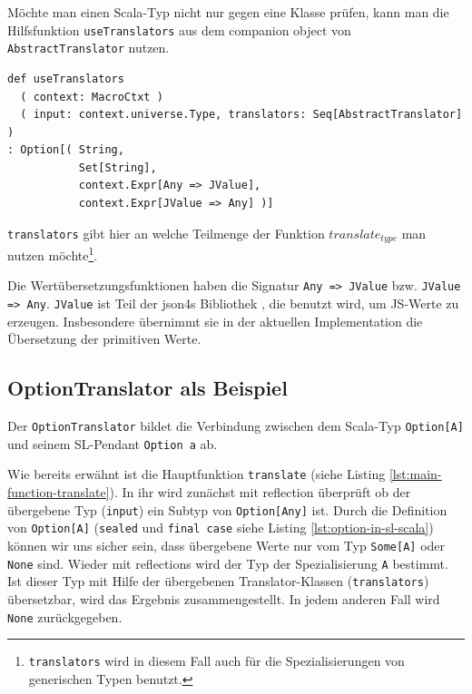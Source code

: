 \documentclass[12pt,bibtotoc]{scrreprt}
\begin{document}
Möchte man einen Scala-Typ nicht nur gegen eine Klasse prüfen, kann man die Hilfsfunktion \lstinline!useTranslators! aus dem companion object von \lstinline!AbstractTranslator! nutzen.

\begin{lstlisting}[caption=Statische Hilfsfunktion in AbstractTranslator, label=lst:hilfsfunktionen]
def useTranslators
  ( context: MacroCtxt )
  ( input: context.universe.Type, translators: Seq[AbstractTranslator] )
: Option[( String,
           Set[String], 
           context.Expr[Any => JValue], 
           context.Expr[JValue => Any] )]
\end{lstlisting}

\lstinline!translators! gibt hier an welche Teilmenge der Funktion $translate_{type}$ man nutzen möchte\footnote{\lstinline!translators! wird in diesem Fall auch für die Spezialisierungen von generischen Typen benutzt.}. 

Die Wertübersetzungsfunktionen haben die Signatur \lstinline!Any => JValue! bzw. \lstinline!JValue => Any!. \lstinline!JValue! ist Teil der json4s Bibliothek \cite{Json4s}, die benutzt wird, um JS-Werte zu erzeugen. Insbesondere übernimmt sie in der aktuellen Implementation die Übersetzung der primitiven Werte.

\subsection{OptionTranslator als Beispiel}
\label{subsec:example-option-translator}

Der \lstinline!OptionTranslator! bildet die Verbindung zwischen dem Scala-Typ \lstinline!Option[A]! und seinem SL-Pendant \lstinline!Option a! ab. 

Wie bereits erwähnt ist die Hauptfunktion \lstinline!translate! (siehe Listing \ref{lst:main-function-translate}). In ihr wird zunächst mit reflection überprüft ob der übergebene Typ (\lstinline!input!) ein Subtyp von \lstinline!Option[Any]! ist. Durch die Definition von \lstinline!Option[A]! (\lstinline!sealed! und \lstinline!final case! siehe Listing \ref{lst:option-in-sl-scala}) können wir uns sicher sein, dass übergebene Werte nur vom Typ \lstinline!Some[A]! oder \lstinline!None! sind. Wieder mit reflections wird der Typ der Spezialisierung \lstinline!A! bestimmt. Ist dieser Typ mit Hilfe der übergebenen Translator-Klassen (\lstinline!translators!) übersetzbar, wird das Ergebnis zusammengestellt. In jedem anderen Fall wird \lstinline!None! zurückgegeben.
\end{document}
